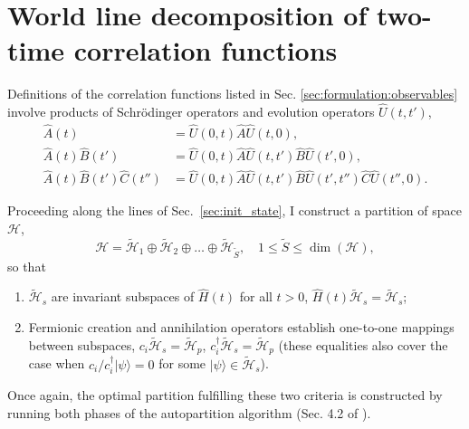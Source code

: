 \documentclass[]{article}
\newcommand{\ket}[1]{\ensuremath{|#1\rangle}}
\begin{document}
\section{\label{sec:worldlines}World line decomposition of two-time correlation functions}

Definitions of the correlation functions listed in Sec. \ref{sec:formulation:observables} involve products of Schr\"odinger operators and evolution operators $\hat U(t, t')$,
\begin{equation}\label{prods}
\begin{aligned}
    \hat A(t) &= \hat U(0,t)\hat A \hat U(t,0),\\
    \hat A(t) \hat B(t') &= \hat U(0,t)\hat A\hat U(t,t')\hat B \hat U(t',0),\\
    \hat A(t) \hat B(t') \hat C(t'') &= \hat U(0,t)\hat A\hat U(t,t')\hat B \hat U(t',t'') \hat C \hat U(t'',0).
\end{aligned}
\end{equation}

Proceeding along the lines of Sec.~\ref{sec:init_state}, I construct a partition of space $\mathcal{H}$,
\begin{equation}\label{tilde_partition}
    \mathcal{H} =
    \mathcal{\tilde H}_1 \oplus \mathcal{\tilde H}_2
    \oplus \ldots \oplus
    \mathcal{\tilde H}_{\tilde S},\quad 1\le \tilde S\le \dim(\mathcal{H}),
\end{equation}
so that
\begin{enumerate}
    \item $\mathcal{\tilde H}_s$ are invariant subspaces of $\hat H(t)$ for all $t>0$, $\hat H(t)\mathcal{\tilde H}_s = \mathcal{\tilde H}_s$;
    \item Fermionic creation and annihilation operators establish one-to-one mappings between subspaces, $c_i\mathcal{\tilde H}_s = \mathcal{\tilde H}_p$, $c^\dagger_i\mathcal{\tilde H}_s = \mathcal{\tilde H}_p$ (these equalities also cover the case when $c_i/c^\dagger_i\ket{\psi} = 0$ for some $\ket{\psi}\in\mathcal{\tilde H}_s$).
\end{enumerate}
Once again, the optimal partition fulfilling these two criteria is constructed
by running both phases of the autopartition algorithm (Sec. 4.2 of \cite{CTHYB}).
\end{document}
